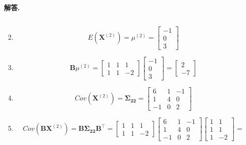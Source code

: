 \documentclass[12pt, a4paper, oneside]{ctexart}
\newenvironment{solution}{\par\noindent\textbf{解答. }}{\par}
\begin{document}
\begin{solution}
\begin{enumerate}[label=(\alph*)]
\[        \]
        \item 
        \[
            E(\mathbf{X}^{(2)})=\mu^{(2)}=
            \begin{bmatrix}
                -1\\
                0\\
                3
            \end{bmatrix}
        \]
        \item 
        \[
            \mathbf{B}\mu^{(2)}=
            \begin{bmatrix}
                1 & 1 & 1\\
                1 & 1 & -2
            \end{bmatrix}
            \begin{bmatrix}
                -1\\
                0\\
                3
            \end{bmatrix}
            =
            \begin{bmatrix}
                2\\
                -7
            \end{bmatrix}
        \]
        \item 
        \[
            Cov(\mathbf{X}^{(2)})=\bm{\Sigma_{22}}=
            \begin{bmatrix}
                6 & 1 & -1 \\
                1 & 4 & 0\\
                -1 & 0 & 2
            \end{bmatrix}
        \] 
        \item 
        \[
            Cov(\mathbf{B}\mathbf{X}^{(2)})=\mathbf{B}\bm{\Sigma_{22}}\mathbf{B^\top}=
            \begin{bmatrix}
                1 & 1 & 1\\
                1 & 1 & -2
            \end{bmatrix}
            \begin{bmatrix}
                6 & 1 & -1 \\
                1 & 4 & 0\\
                -1 & 0 & 2
            \end{bmatrix}
            \begin{bmatrix}
                1 & 1 \\
                1 & 1\\
                1 & -2
            \end{bmatrix}=
\]
\end{enumerate}
\end{solution}
\end{document}
